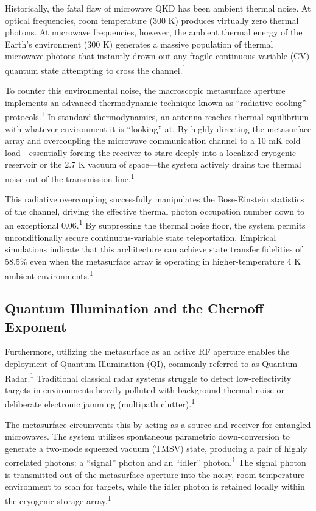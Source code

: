 \documentclass[11pt, a4paper]{article}
\begin{document}
Historically, the fatal flaw of microwave QKD has been ambient thermal noise. At optical frequencies, room temperature (300 K) produces virtually zero thermal photons. At microwave frequencies, however, the ambient thermal energy of the Earth's environment (300 K) generates a massive population of thermal microwave photons that instantly drown out any fragile continuous-variable (CV) quantum state attempting to cross the channel.\textsuperscript{1}

To counter this environmental noise, the macroscopic metasurface aperture implements an advanced thermodynamic technique known as ``radiative cooling'' protocols.\textsuperscript{1} In standard thermodynamics, an antenna reaches thermal equilibrium with whatever environment it is ``looking'' at. By highly directing the metasurface array and overcoupling the microwave communication channel to a 10 mK cold load---essentially forcing the receiver to stare deeply into a localized cryogenic reservoir or the 2.7 K vacuum of space---the system actively drains the thermal noise out of the transmission line.\textsuperscript{1}

This radiative overcoupling successfully manipulates the Bose-Einstein statistics of the channel, driving the effective thermal photon occupation number down to an exceptional 0.06.\textsuperscript{1} By suppressing the thermal noise floor, the system permits unconditionally secure continuous-variable state teleportation. Empirical simulations indicate that this architecture can achieve state transfer fidelities of 58.5\% even when the metasurface array is operating in higher-temperature 4 K ambient environments.\textsuperscript{1}

\subsection*{Quantum Illumination and the Chernoff Exponent}

Furthermore, utilizing the metasurface as an active RF aperture enables the deployment of Quantum Illumination (QI), commonly referred to as Quantum Radar.\textsuperscript{1} Traditional classical radar systems struggle to detect low-reflectivity targets in environments heavily polluted with background thermal noise or deliberate electronic jamming (multipath clutter).\textsuperscript{1}

The metasurface circumvents this by acting as a source and receiver for entangled microwaves. The system utilizes spontaneous parametric down-conversion to generate a two-mode squeezed vacuum (TMSV) state, producing a pair of highly correlated photons: a ``signal'' photon and an ``idler'' photon.\textsuperscript{1} The signal photon is transmitted out of the metasurface aperture into the noisy, room-temperature environment to scan for targets, while the idler photon is retained locally within the cryogenic storage array.\textsuperscript{1}
\end{document}
